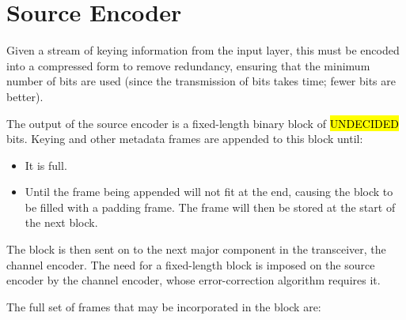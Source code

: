 \documentclass[a4paper]{tufte-handout}
\begin{document}
\section{Source Encoder}
Given a stream of keying information from the input layer, this must be encoded into a compressed form to remove redundancy, ensuring that the minimum number of bits are used (since the transmission of bits takes time; fewer bits are better).

The output of the source encoder is a fixed-length binary block of \hl{UNDECIDED} bits. Keying and other metadata frames are appended to this block until:
\begin{itemize}
    \setlength\itemsep{-0.5em}
	\item It is full.
	\item Until the frame being appended will not fit at the end, causing the block to be filled with a padding frame. The frame will then be stored at the start of the next block.
\end{itemize}
The block is then sent on to the next major component in the transceiver, the channel encoder.
The need for a fixed-length block is imposed on the source encoder by the channel encoder, whose error-correction algorithm requires it.

The full set of frames that may be incorporated in the block are:
\end{document}
